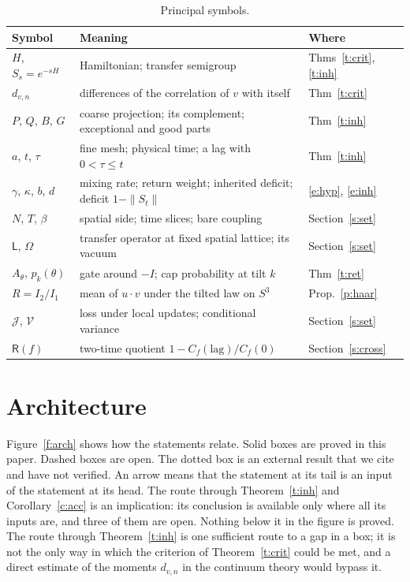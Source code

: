 \begin{table}[ht]
\centering\small
\begin{tabular}{@{}lll@{}}
\toprule
Symbol & Meaning & Where \\
\midrule
$H$, $S_s=e^{-sH}$ & Hamiltonian; transfer semigroup & Thms~\ref{t:crit}, \ref{t:inh} \\
$d_{v,n}$ & differences of the correlation of $v$ with itself & Thm~\ref{t:crit} \\
$P$, $Q$, $B$, $G$ & coarse projection; its complement; exceptional and good parts & Thm~\ref{t:inh} \\
$a$, $t$, $\tau$ & fine mesh; physical time; a lag with $0<\tau\le t$ & Thm~\ref{t:inh} \\
$\gamma$, $\kappa$, $b$, $d$ & mixing rate; return weight; inherited deficit; deficit $1-\|S_t\|$ & \eqref{e:hyp}, \eqref{e:inh} \\
$N$, $T$, $\beta$ & spatial side; time slices; bare coupling & Section~\ref{s:set} \\
$\mathsf L$, $\Omega$ & transfer operator at fixed spatial lattice; its vacuum & Section~\ref{s:set} \\
$A_\theta$, $p_k(\theta)$ & gate around $-I$; cap probability at tilt $k$ & Thm~\ref{t:ret} \\
$R=I_2/I_1$ & mean of $u\cdot v$ under the tilted law on $S^3$ & Prop.~\ref{p:haar} \\
$\mathcal J$, $\mathcal V$ & loss under local updates; conditional variance & Section~\ref{s:set} \\
$\mathsf R(f)$ & two-time quotient $1-C_f(\text{lag})/C_f(0)$ & Section~\ref{s:cross} \\
\bottomrule
\end{tabular}
\caption{Principal symbols.}\label{tab:sym}
\end{table}

\section{Architecture}\label{s:arch}
Figure~\ref{f:arch} shows how the statements relate. Solid boxes are proved in this paper. Dashed boxes are
open. The dotted box is an external result that we cite and have not verified. An arrow means that the
statement at its tail is an input of the statement at its head. The route through Theorem~\ref{t:inh} and
Corollary~\ref{c:acc} is an implication: its conclusion is available only where all its inputs are, and three
of them are open. Nothing below it in the
figure is proved. The route through Theorem~\ref{t:inh} is one sufficient route to a gap in a box; it is not
the only way in which the criterion of Theorem~\ref{t:crit} could be met, and a direct estimate of the
moments $d_{v,n}$ in the continuum theory would bypass it.

